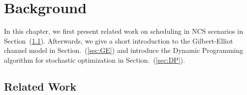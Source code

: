 \chapter{Background}


In this chapter, we first present related work on scheduling in NCS scenarios in
Section~(\ref{sec:survey}). Afterwards, we give a short introduction to the
Gilbert-Elliot channel model in Section.~(\ref{sec:GE}) and introduce the Dynamic
Programming algorithm for stochastic optimization in Section.~(\ref{sec:DP}).

\section{Related Work} \label{sec:survey}

